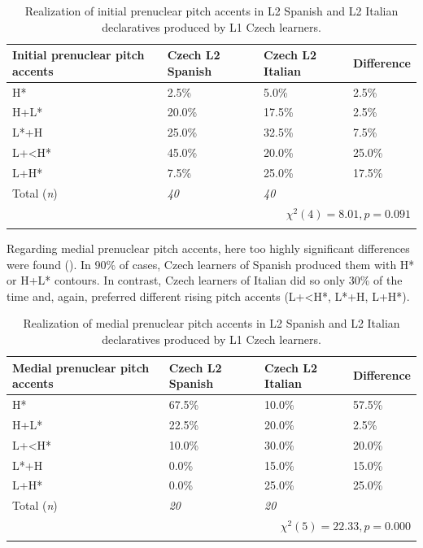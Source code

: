 \begin{table}
\begin{tabularx}{\textwidth}{lYYY}

\lsptoprule

{Initial prenuclear pitch accents} & {Czech L2 Spanish} & {Czech L2 Italian} & {Difference}\\
\midrule
H* &  2.5\% &  5.0\% &  2.5\%\\
H+L* &  20.0\% &  17.5\% &  2.5\%\\
L*+H &  25.0\% &  32.5\% &  7.5\%\\
L+<H* &  45.0\% &  20.0\% &  25.0\%\\
L+H* &  7.5\% &  25.0\% &  17.5\%\\
\midrule
Total (\textit{n}) & {\itshape 40} & {\itshape 40} &  \\
\\
\lspbottomrule
\end{tabularx}

\caption{Realization of initial prenuclear pitch accents in L2 Spanish and L2 Italian declaratives produced by L1 Czech learners.}
\label{tab:4.6}
\end{table}

Regarding medial prenuclear pitch accents, here too highly significant differences were found (). In 90\% of cases, Czech learners of Spanish produced them with H* or H+L* contours. In contrast, Czech learners of Italian did so only 30\% of the time and, again, preferred different rising pitch accents (L+<H*, L*+H, L+H*).

\begin{table}
\begin{tabularx}{\textwidth}{lYYY}

\lsptoprule

{Medial prenuclear pitch accents} & {Czech L2 Spanish} & {Czech L2 Italian} & {Difference}\\
\midrule
H* &  67.5\% &  10.0\% &  57.5\%\\
H+L* &  22.5\% &  20.0\% &  2.5\%\\
L+<H* &  10.0\% &  30.0\% &  20.0\%\\
L*+H &  0.0\% & 15.0\% &  15.0\%\\
L+H* &  0.0\% & 25.0\% &  25.0\%\\
\midrule
Total (\textit{n}) & {\itshape 20} & {\itshape 20} &  \\
\\
\lspbottomrule
\end{tabularx}

\caption{Realization of medial prenuclear pitch accents in L2 Spanish and L2 Italian declaratives produced by L1 Czech learners.}
\label{tab:4.7}
\end{table}

